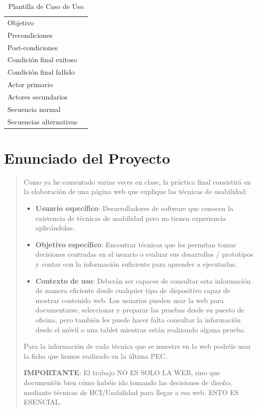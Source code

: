 \documentclass[12pt, a4paper]{report}
\begin{document}
\begin{table}[H]
\centering
\begin{tabularx}{\linewidth}{lX}
\toprule
Objetivo & \\
Precondiciones & \\
Post-condiciones & \\
Condición final exitoso & \\
Condición final fallido & \\
Actor primario & \\
Actores secundarios & \\
Secuencia normal & \\
Secuencias alternativas & \\
\bottomrule
\end{tabularx}
\caption{Plantilla de Caso de Uso}
\end{table}

\chapter{Enunciado del Proyecto}
\label{anx:enunciado}

\begin{quote}
Como ya he comentado varias veces en clase, la práctica final consistirá en la elaboración
de una página web que explique las técnicas de usabilidad:

\begin{itemize}
  \item \textbf{Usuario específico}: Desarrolladores de software que conocen la existencia de
    técnicas de usabilidad pero no tienen experiencia aplicándolas.
  \item \textbf{Objetivo específico}: Encontrar técnicas que les permitan tomar decisiones
    centradas en el usuario o evaluar sus desarrollos / prototipos y contar con la información
    suficiente para aprender a ejecutarlas.
  \item \textbf{Contexto de uso}: Deberán ser capaces de consultar esta información de manera
    eficiente desde cualquier tipo de dispositivo capaz de mostrar contenido web. Los usuarios
    pueden usar la web para documentarse, seleccionar y preparar las pruebas desde su puesto de
    oficina, pero también les puede hacer falta consultar la información desde el móvil o una tablet
    mientras están realizando alguna prueba.
\end{itemize}

Para la información de cada técnica que se muestre en la web podréis usar la ficha que hemos
realizado en la última PEC.

\textbf{IMPORTANTE}: El trabajo NO ES SOLO LA WEB, sino que documentéis bien cómo habéis
ido tomando las decisiones de diseño, mediante técnicas de HCI/Usabilidad para llegar a esa web.
ESTO ES ESENCIAL.
\end{quote}

\end{document}
